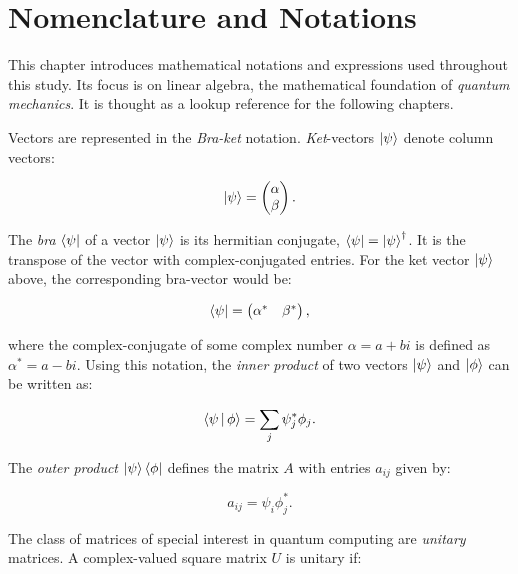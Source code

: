 \chapter{Nomenclature and Notations}

This chapter introduces mathematical notations and expressions used throughout 
this study. Its focus is on linear algebra, the mathematical foundation of 
\textit{quantum mechanics}. It is thought as a lookup reference for the following chapters.

Vectors are represented in the \textit{Bra-ket} notation. \textit{Ket}-vectors $\Ket{\psi}$ denote 
column vectors:

\begin{equation}
   \Ket{\psi} = \begin{pmatrix} \alpha \\ \beta \end{pmatrix}.
\end{equation}

The \textit{bra} $\Bra{\psi}$ of a vector $\Ket{\psi}$ is its hermitian conjugate, 
$\Bra{\psi} = \Ket{\psi}^{\dagger}$. It is the transpose of the vector with complex-conjugated 
entries. For the ket vector $\Ket{\psi}$ above, the corresponding bra-vector would be:

\begin{equation}
   \Bra{\psi} = \begin{pmatrix}
      \alpha^* & \beta^*
   \end{pmatrix},
\end{equation}

where the complex-conjugate of some complex number $\alpha = a + b i$ is 
defined as $\alpha^* = a - b i$. Using this notation, the \textit{inner product} of two vectors
$\Ket{\psi}$ and $\Ket{\phi}$ can be written as:

\begin{equation}
   \Braket{\psi | \phi} = \sum_j \psi_j^* \phi_j.
\end{equation}

The \textit{outer product} $\Ket{\psi} \Bra{\phi}$ defines the matrix $A$ with entries 
$a_{ij}$ given by:

\begin{equation}
   a_{ij} = \psi_i \phi^*_j.
\end{equation}

The class of matrices of special interest in quantum computing are \textit{unitary} matrices.
A complex-valued square matrix $U$ is unitary if:

